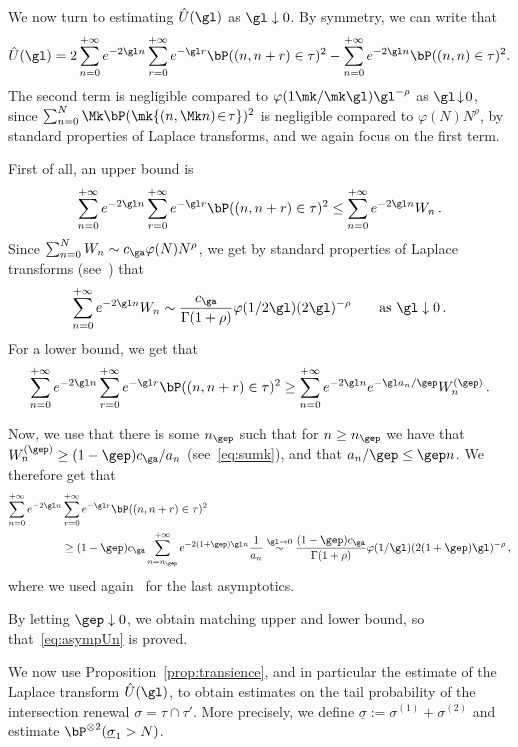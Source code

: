 \begin{appendix}
\begin{proofc}
We now turn to estimating $\hat U (\gl)$ as $\gl \downarrow 0$. By symmetry, we can write that
\[
\hat U(\gl) = 2\sum_{n=0}^{+\infty} e^{-2 \gl n}\sum_{r=0}^{+\infty} e^{-\gl r} \bP((n,n+r)\in\tau)^2 - \sum_{n=0}^{+\infty} e^{-2\gl n} \bP((n,n)\in\tau)^2.
\]
The second term is negligible compared to $ \varphi(1\mk/\mk\gl) \gl^{-\rho}$ as $\gl \!\downarrow\! 0$, since $\sum_{n=0}^N\Mk \bP(\mk{(n,\Mk n)\!\in\!\tau})^2$ is negligible compared to $ \varphi(N)N^{\rho}$, by standard properties of Laplace transforms, and we again focus on the first term.

First of all, an upper bound is
\[
\sum_{n=0}^{+\infty} e^{-2 \gl n}\sum_{r=0}^{+\infty} e^{-\gl r} \bP((n,n+r)\in\tau)^2 \leq \sum_{n=0}^{+\infty} e^{-2\gl n} W_n\,.
\]
Since $\sum_{n=0}^{N} W_n \sim c_{\ga} \varphi(N)N^{\rho}$, we get by standard properties of Laplace transforms (see~\cite[Corollary~1.7.3]{cf:BGT}) that
\[
\sum_{n=0}^{+\infty} e^{-2\gl n} W_n \sim \frac{c_\ga}{\Gamma(1+\rho)} \varphi(1/2\gl) (2\gl)^{-\rho} \qquad \text{as } \gl \downarrow 0\,.
\]
For a lower bound, we get that
\[
\sum_{n=0}^{+\infty} e^{-2 \gl n}\sum_{r=0}^{+\infty} e^{-\gl r} \bP((n,n+r)\in\tau)^2 \geq \sum_{n=0}^{+\infty} e^{-2\gl n} e^{-\gl a_n /\gep} W_n^{(\gep)}\,.
\]

Now, we use that there is some $n_{\gep}$ such that for $n\geq n_{\gep}$ we have that $W_n^{(\gep)}\geq (1-\gep) c_{\ga} /a_n$ (see~\eqref{eq:sumk}), and that $a_n/\gep \leq \gep n$. We therefore get that
\begin{align*}
\sum_{n=0}^{+\infty} e^{-2 \gl n}&\sum_{r=0}^{+\infty} e^{-\gl r} \bP((n,n+r)\in\tau)^2 \\
& \geq (1-\gep) c_\ga \sum_{n=n_{\gep}}^{+\infty} e^{-2(1+\gep)\gl n} \frac{1}{a_n} \stackrel{\gl\to 0}{\sim} \frac{(1-\gep) c_\ga}{\Gamma(1+\rho)} \varphi(1/\gl) (2(1+\gep) \gl)^{-\rho}\,,
\end{align*}
where we used again~\cite[Corollary~1.7.3]{cf:BGT} for the last asymptotics.

By letting $\gep \downarrow 0$, we obtain matching upper and lower bound, so that~\eqref{eq:asympUn} is proved.
\end{proofc}

We now use Proposition~\ref{prop:transience}, and in particular the estimate of the Laplace transform $\hat U(\gl)$, to obtain estimates on the tail probability of the intersection renewal $\sigma=\tau\cap \tau'$. More precisely, we define $\underline{\sigma}:= \sigma^{(1)} + \sigma^{(2)}$ and estimate $\bP^{\otimes 2}(\underline \sigma _1 >N)$.


\end{appendix}
